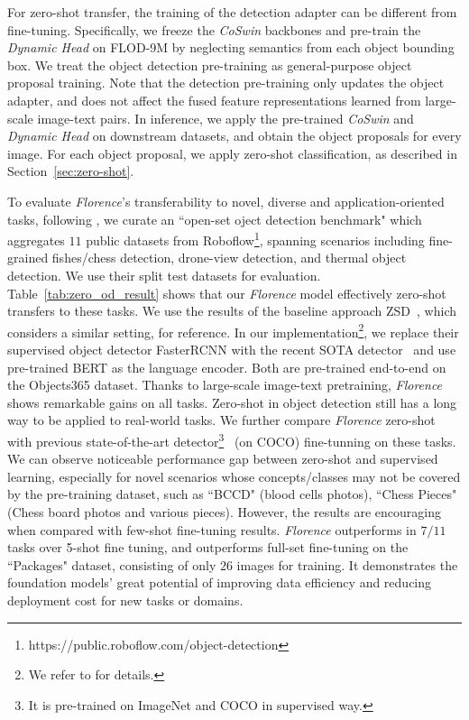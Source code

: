 \documentclass{article}
\begin{document}
For zero-shot transfer, the training of the detection adapter can be different from fine-tuning.
Specifically, we freeze the \emph{CoSwin} backbones and pre-train the \emph{Dynamic Head} on FLOD-9M
by neglecting semantics from each object bounding box. We treat the object detection pre-training as
general-purpose object proposal training. Note that the detection pre-training only updates the object adapter, and does not affect the fused
feature representations learned from large-scale image-text pairs. In inference, we apply the pre-trained \emph{CoSwin} and \emph{Dynamic Head} on
downstream datasets, and obtain the object proposals for every image. For each object proposal, we
apply zero-shot classification, as described in Section~\ref{sec:zero-shot}.

To evaluate \emph{Florence}'s transferability to novel, diverse and application-oriented tasks, following \cite{harold_GLIP2021}, we curate an ``open-set oject detection benchmark" which aggregates $11$  public datasets from
Roboflow\footnote{https://public.roboflow.com/object-detection}, spanning scenarios including fine-grained fishes/chess detection, drone-view detection, and thermal object detection. We use their split test datasets for evaluation. Table~\ref{tab:zero_od_result} shows that our \emph{Florence} model effectively zero-shot transfers to these tasks. We use the results of the baseline approach ZSD~\cite{bansal2018zero}, which considers a similar setting, for reference. In our implementation\footnote{We refer to \cite{harold_GLIP2021} for details.}, we replace their supervised object detector FasterRCNN with the recent SOTA detector~\cite{Dai_2021_CVPR} and use pre-trained BERT as the language encoder. Both are pre-trained end-to-end on the Objects365 dataset. Thanks to large-scale image-text pretraining, \emph{Florence} shows remarkable
gains on all tasks. Zero-shot in object detection still has a long way to be applied to
real-world tasks.
We further compare \emph{Florence} zero-shot with previous state-of-the-art
detector\footnote{It is pre-trained on ImageNet and COCO in supervised way.}~\cite{Dai_2021_CVPR} (on
COCO) fine-tunning on these tasks. We can observe noticeable performance gap between zero-shot and
supervised learning, especially for novel scenarios whose concepts/classes may not be covered by the pre-training dataset, such as ``BCCD" (blood cells photos), ``Chess Pieces" (Chess board photos and
various pieces). However, the results are  encouraging when compared with few-shot fine-tuning
results. \emph{Florence} outperforms in $7/11$ tasks over 5-shot fine tuning, and outperforms full-set fine-tuning on the ``Packages" dataset, consisting of only $26$ images for training. It demonstrates
the foundation models' great potential of improving data efficiency and reducing deployment cost for new tasks or domains.
\end{document}
